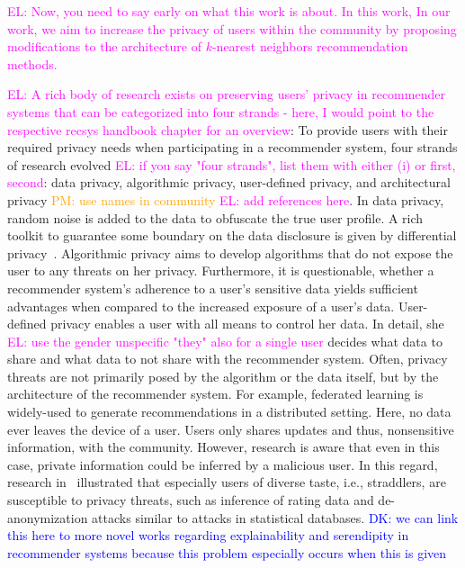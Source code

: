\documentclass[manuscript,review,anonymous]{acmart}
\newcommand{\el}[1]{
        \textcolor{magenta}{EL: #1}}
\newcommand{\dk}[1]{
        \textcolor{blue}{DK: #1}}
\newcommand{\pmu}[1]{
        \textcolor{orange}{PM: #1}}
\begin{document}
\el{Now, you need to say early on what this work is about. In this work, In our work, we aim to increase the privacy of users within the community by proposing modifications to the architecture of $k$-nearest neighbors recommendation methods.}
\el{A rich body of research exists on preserving users' privacy in recommender systems that can be categorized into four strands - here, I would point to the respective recsys handbook chapter for an overview}: To provide users with their required privacy needs when participating in a recommender system, four strands of research evolved \el{if you say "four strands", list them with either (i) or first, second}: data privacy, algorithmic privacy, user-defined privacy, and architectural privacy \pmu{use names in community} \el{add references here}. 
In data privacy, random noise is added to the data to obfuscate the true user profile.
A rich toolkit to guarantee some boundary on the data disclosure is given by differential privacy~\cite{dwork2014algorithmic}.
Algorithmic privacy aims to develop algorithms that do not expose the user to any threats on her privacy.
Furthermore, it is questionable, whether a recommender system's adherence to a user's sensitive data yields sufficient advantages when compared to the increased exposure of a user's data.
User-defined privacy enables a user with all means to control her data. 
In detail, she \el{use the gender unspecific "they" also for a single user} decides what data to share and what data to not share with the recommender system.
Often, privacy threats are not primarily posed by the algorithm or the data itself, but by the architecture of the recommender system. 
For example, federated learning is widely-used to generate recommendations in a distributed setting.
Here, no data ever leaves the device of a user.
Users only shares updates and thus, nonsensitive information, with the community.
However, research is aware that even in this case, private information could be inferred by a malicious user. 
In this regard, research in~\cite{ramakrishnan2001being} illustrated that especially users of diverse taste, i.e., straddlers, are susceptible to privacy threats, such as inference of rating data and de-anonymization attacks similar to attacks in statistical databases. \dk{we can link this here to more novel works regarding explainability and serendipity in recommender systems because this problem especially occurs when this is given}
\end{document}
